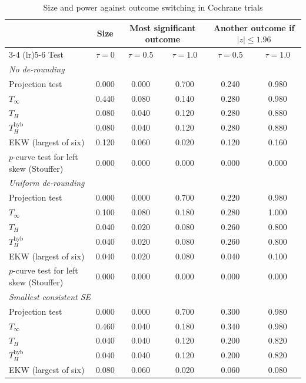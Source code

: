 \begin{table}[htbp]
\centering
\caption{Size and power against outcome switching in Cochrane trials}
\label{tab:cochrane_switching_power_main}
\footnotesize
\setlength{\tabcolsep}{4pt}
\begin{tabular}{lccccc}
\toprule
 & Size & \multicolumn{2}{c}{Most significant outcome} & \multicolumn{2}{c}{Another outcome if $|z| \le 1.96$} \\
\cmidrule(lr){3-4} \cmidrule(lr){5-6}
Test & $\tau = 0$ & $\tau = 0.5$ & $\tau = 1.0$ & $\tau = 0.5$ & $\tau = 1.0$ \\
\midrule
\multicolumn{6}{l}{\textit{No de-rounding}} \\
Projection test & 0.000 & 0.000 & 0.700 & 0.240 & 0.980 \\
$T_\infty$ & 0.440 & 0.080 & 0.140 & 0.280 & 0.980 \\
$T_H$ & 0.080 & 0.040 & 0.120 & 0.280 & 0.880 \\
$T_H^{\mathrm{hyb}}$ & 0.080 & 0.040 & 0.120 & 0.280 & 0.880 \\
EKW (largest of six) & 0.120 & 0.060 & 0.020 & 0.120 & 0.160 \\
$p$-curve test for left skew (Stouffer) & 0.000 & 0.000 & 0.000 & 0.000 & 0.000 \\
\midrule
\multicolumn{6}{l}{\textit{Uniform de-rounding}} \\
Projection test & 0.000 & 0.000 & 0.700 & 0.220 & 0.980 \\
$T_\infty$ & 0.100 & 0.080 & 0.180 & 0.280 & 1.000 \\
$T_H$ & 0.040 & 0.020 & 0.080 & 0.260 & 0.800 \\
$T_H^{\mathrm{hyb}}$ & 0.040 & 0.020 & 0.080 & 0.260 & 0.800 \\
EKW (largest of six) & 0.040 & 0.020 & 0.080 & 0.040 & 0.100 \\
$p$-curve test for left skew (Stouffer) & 0.000 & 0.000 & 0.000 & 0.000 & 0.000 \\
\midrule
\multicolumn{6}{l}{\textit{Smallest consistent SE}} \\
Projection test & 0.000 & 0.000 & 0.700 & 0.300 & 0.980 \\
$T_\infty$ & 0.460 & 0.040 & 0.180 & 0.340 & 0.980 \\
$T_H$ & 0.040 & 0.040 & 0.120 & 0.200 & 0.820 \\
$T_H^{\mathrm{hyb}}$ & 0.040 & 0.040 & 0.120 & 0.200 & 0.820 \\
EKW (largest of six) & 0.080 & 0.060 & 0.020 & 0.060 & 0.080 \\

\end{tabular}
\end{table}
